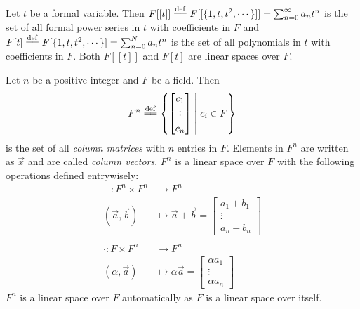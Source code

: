 \documentclass[11pt,fleqn]{book} %
\begin{document}
\begin{example}
    Let $t$ be a formal variable. Then $F[[t]] \overset{\mathrm{def}}{=\joinrel=} F[[\{ 1, t, t^2, \cdots \}]] = \sum_{n = 0}^{\infty} a_n t^n$ is the set of all formal power series in $t$ with coefficients in $F$ and $F[t] \overset{\mathrm{def}}{=\joinrel=} F[\{ 1, t, t^2, \cdots \}] = \sum_{n = 0}^{N} a_n t^n$ is the set of all polynomials in $t$ with coefficients in $F$. Both $F[[t]]$ and $F[t]$ are linear spaces over $F$.
\end{example}

\begin{example}
    Let $n$ be a positive integer and $F$ be a field. Then 
    \[
        F^n \overset{\mathrm{def}}{=\joinrel=} \left\{ 
        \begin{bmatrix}
        c_1 \\
        \vdots \\
        c_n
        \end{bmatrix}
        \;\middle|\; c_i \in F
        \right\}
    \]
    is the set of all \emph{column matrices} with $n$ entries in $F$. Elements in $F^n$ are written as $\vec{x}$ and are called \emph{column vectors}. $F^n$ is a linear space over $F$ with the following operations defined entrywisely:
    \[
        \begin{split}
            + : F^n \times F^n &\to F^n \\
            (\vec{a}, \vec{b}) &\mapsto \vec{a} + \vec{b} = \begin{bmatrix}
            a_1 + b_1 \\
            \vdots \\
            a_n + b_n
            \end{bmatrix} \\ \\
            \cdot : F \times F^n &\to F^n \\
            (\alpha, \vec{a}) &\mapsto \alpha \vec{a} = \begin{bmatrix}
            \alpha a_1 \\
            \vdots \\
            \alpha a_n
            \end{bmatrix}
        \end{split}
    \]
    $F^n$ is a linear space over $F$ automatically as $F$ is a linear space over itself.
\end{example}

\end{document}
